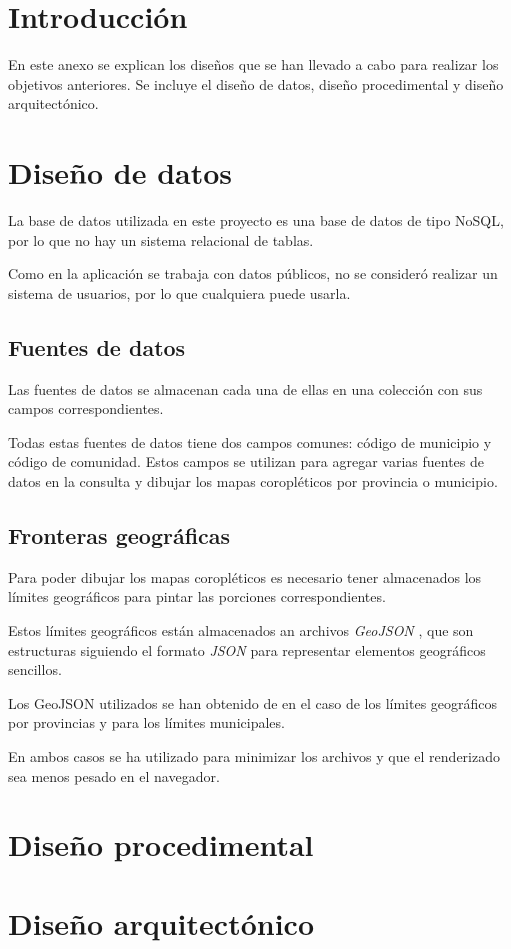 
\section{Introducción}

En este anexo se explican los diseños que se han llevado a cabo para realizar los objetivos anteriores. Se incluye el diseño de datos, diseño procedimental y diseño arquitectónico.

\section{Diseño de datos}

La base de datos utilizada en este proyecto es una base de datos de tipo NoSQL, por lo que no hay un sistema relacional de tablas.

Como en la aplicación se trabaja con datos públicos, no se consideró realizar un sistema de usuarios, por lo que cualquiera puede usarla.

\subsection{Fuentes de datos}

Las fuentes de datos se almacenan cada una de ellas en una colección con sus campos correspondientes.

Todas estas fuentes de datos tiene dos campos comunes: código de municipio y código de comunidad. Estos campos se utilizan para agregar varias fuentes de datos en la consulta y dibujar los mapas coropléticos por provincia o municipio.


\subsection{Fronteras geográficas}

Para poder dibujar los mapas coropléticos es necesario tener almacenados los límites geográficos para pintar las porciones correspondientes.

Estos límites geográficos están almacenados an archivos \textit{GeoJSON} \cite{misc:geojson}, que son estructuras siguiendo el formato \textit{JSON} para representar elementos geográficos sencillos.

Los GeoJSON utilizados se han obtenido de \cite{misc:limitesmunicipales} en el caso de los límites geográficos por provincias y \cite{misc:carto} para los límites municipales.

En ambos casos se ha utilizado  \cite{misc:mapshaper} para minimizar los archivos y que el renderizado sea menos pesado en el navegador.

\section{Diseño procedimental}

\section{Diseño arquitectónico}


